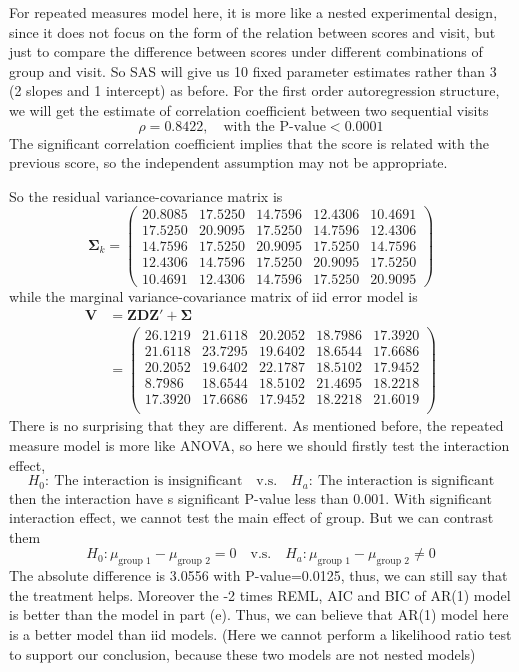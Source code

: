 \documentclass[letterpaper, 12pt]{article}
\newcommand{\ba}{$$\begin{aligned}}
\newcommand{\ea}{\end{aligned}$$}
\newcommand{\lma}{\left(\begin{matrix}}
\newcommand{\rma}{\end{matrix}\right)}
\begin{document}
For repeated measures model here, it is more like a nested experimental design, since it does not focus on the form of the relation between scores and visit, but just to compare the difference between scores under different combinations of group and visit. So SAS will give us 10 fixed parameter estimates rather than 3 (2 slopes and 1 intercept) as before. For the first order autoregression structure, we will get the estimate of correlation coefficient between two sequential visits
$$
\rho=0.8422,\quad\text{with the P-value}<0.0001
$$
The significant correlation coefficient implies that the score is related with the previous score, so the independent assumption may not be appropriate.


So the residual variance-covariance matrix is
$$
\bm{\Sigma}_k=\lma
20.8085 &17.5250 &14.7596 &12.4306 &10.4691 \\
17.5250 &20.9095 &17.5250 &14.7596 &12.4306 \\
14.7596 &17.5250 &20.9095 &17.5250 &14.7596 \\
12.4306 &14.7596 &17.5250 &20.9095 &17.5250 \\
10.4691 &12.4306 &14.7596 &17.5250 &20.9095 
\rma
$$
while the marginal variance-covariance matrix of iid error model is
\ba
\bm{V}&=\bm{ZDZ}'+\bm{\Sigma}\\
&=\lma
26.1219 &21.6118 & 20.2052 &18.7986 &17.3920\\
21.6118 &23.7295 & 19.6402 &18.6544& 17.6686\\
20.2052 &19.6402& 22.1787 &18.5102& 17.9452\\
8.7986 &18.6544 &18.5102 &21.4695 &18.2218\\
17.3920 &17.6686& 17.9452 &18.2218& 21.6019\\
\rma
\ea
There is no surprising that they are different. As mentioned before, the repeated measure model is more like ANOVA, so here we should firstly test the interaction effect,
$$
H_0:~\text{The interaction is insignificant}\quad\text{v.s.}\quad H_a:~\text{The interaction is significant}
$$
then the interaction have s significant P-value less than 0.001. With significant interaction effect, we cannot test the main effect of group. But we can contrast them
$$
H_0:\mu_\text{group 1}-\mu_\text{group 2}=0\quad\text{v.s.}\quad H_a:\mu_\text{group 1}-\mu_\text{group 2}\not=0
$$
The absolute difference is 3.0556 with P-value=0.0125, thus, we can still say that the treatment helps. Moreover the -2 times REML, AIC and BIC of AR(1) model is better than the model in part (e). Thus, we can believe that AR(1) model here is a better model than iid models. (Here we cannot perform a likelihood ratio test to support our conclusion, because these two models are not nested models)
\end{document}
